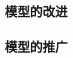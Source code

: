 \documentclass[withoutpreface,bwprint]{cumcmthesis}
\begin{document}
\subsection{模型的改进}






\subsection{模型的推广}






































\nocite{*}
\end{document}
